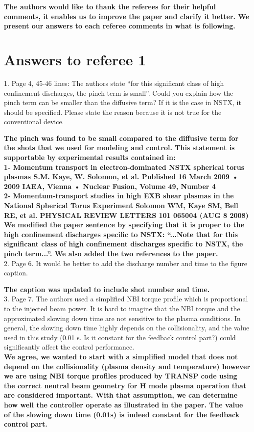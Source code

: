 \documentclass{scrartcl}
\newcommand{\response}[1]{\textcolor{red!80!black}{\bf #1}}
\begin{document}
\response{The authors would like to thank the referees for their helpful comments, it enables us to improve the paper and clarify it better.
We present our answers to each referee comments in what is following.}
\section{Answers to referee 1}

1. Page 4, 45-46 lines: The authors state “for this significant class of high confinement discharges, the pinch term is small”. Could you explain how the pinch term can be smaller than the diffusive term? If it is the case in NSTX, it should be specified. Please state the reason because it is not true for the conventional device.

\response{The pinch was found to be small compared to the diffusive term for the shots that we used for modeling and control.
This statement is supportable by experimental results contained in:  \\
1- Momentum transport in electron-dominated NSTX spherical torus plasmas
S.M. Kaye, W. Solomon,  et al. Published 16 March 2009 • 2009 IAEA, Vienna • Nuclear Fusion, Volume 49, Number 4\\
2- Momentum-transport studies in high EXB shear plasmas in the National Spherical Torus Experiment 
Solomon WM, Kaye SM, Bell RE, et al. 
PHYSICAL REVIEW LETTERS 101 065004 (AUG 8 2008)\\
We modified the paper sentence by specifying that it is proper to the high confinement discharges specific to NSTX:   ``...Note that for this significant class of high confinement discharges specific to NSTX, the pinch term...''.
We also added the two references to the paper.}\\

2. Page 6. It would be better to add the discharge number and time to the figure caption.

\response{The caption was updated to include shot number and time.} \\

3. Page 7. The authors used a simplified NBI torque profile which is proportional to the injected beam power. It is hard to imagine that the NBI torque and the approximated slowing down time are not sensitive to the plasma conditions. In general, the slowing down time highly depends on the collisionality, and the value used in this study (0.01 s. Is it constant for the feedback control part?) could significantly affect the control performance. \\
\response{We agree, we wanted to start with a simplified model that does not depend on the collisionality (plasma density and temperature) however we are using NBI torque profiles produced by TRANSP code using the correct neutral beam geometry for H mode plasma operation that are considered important. With that assumption, we can determine how well the controller operate as illustrated in the paper.
The value of the slowing down time (0.01s) is indeed constant for the feedback control part.}\\
\end{document}
